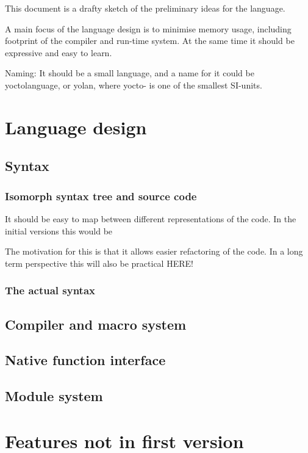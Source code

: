 This document is a drafty sketch of the preliminary ideas for the language. 



A main focus of the language design is to minimise memory usage, including footprint of the compiler and run-time system.
At the same time it should be expressive and easy to learn.

Naming: It should be a small language, and a name for it could be yoctolanguage, or yolan, where yocto- is one of the smallest SI-units.

\section{Language design}

\subsection{Syntax}
\subsubsection{Isomorph syntax tree and source code}
It should be easy to map between different representations of the code.
In the initial versions this would be 

The motivation for this is that it allows easier refactoring of the code.
In a long term perspective this will also be practical HERE!

\subsubsection{The actual syntax}


\subsection{Compiler and macro system}
\subsection{Native function interface}

\subsection{Module system}

\section{Features not in first version}
